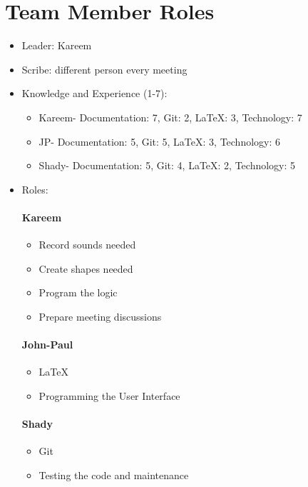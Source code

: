 \documentclass{article}
\begin{document}
\section{Team Member Roles}
\begin{itemize}
\item Leader: Kareem
\item Scribe: different person every meeting
\item Knowledge and Experience (1-7):

\begin{itemize}
\item Kareem- Documentation: 7, Git: 2, LaTeX: 3, Technology: 7
\item  JP- Documentation: 5, Git: 5, LaTeX: 3, Technology: 6
\item Shady- Documentation: 5, Git: 4, LaTeX: 2, Technology: 5
\end{itemize}

\item Roles:

\paragraph{Kareem}
\begin{itemize}
\item Record sounds needed
\item Create shapes needed
\item Program the logic
\item Prepare meeting discussions
\end{itemize}

\paragraph{John-Paul}
\begin{itemize}
\item LaTeX
\item Programming the User Interface
\end{itemize}

\paragraph{Shady}
\begin{itemize}
\item Git
\item Testing the code and maintenance
\end{itemize}

\end{itemize}
\end{document}
